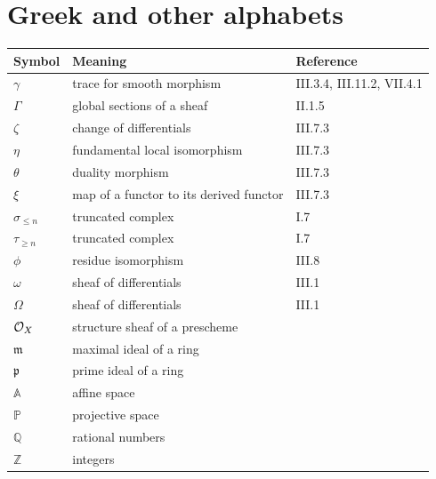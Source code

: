 \section*{Greek and other alphabets}
\begin{longtable}{@{}l p{8cm} l@{}}
	\toprule
	Symbol & Meaning & Reference \\
	\midrule
	$\gamma$ & trace for smooth morphism & III.3.4, III.11.2, VII.4.1 \\
	$\Gamma$ & global sections of a sheaf & II.1.5 \\
	$\zeta$ & change of differentials & III.7.3 \\
	$\eta$ & fundamental local isomorphism  & III.7.3 \\
	$\theta$ & duality morphism  & III.7.3 \\
	$\xi$ & map of a functor to its derived functor  & III.7.3 \\
	$\sigma_{\leq n}$ & truncated complex & I.7 \\
	$\tau_{\geq n}$ & truncated complex & I.7 \\
	$\phi$ & residue isomorphism & III.8 \\
	$\omega$ & sheaf of differentials & III.1 \\
	$\Omega$ & sheaf of differentials & III.1 \\
	$\mathcal{O}_X$ & structure sheaf of a prescheme & \\
	$\mathfrak{m}$ & maximal ideal of a ring & \\
	$\mathfrak{p}$ & prime ideal of a ring & \\
	$\mathbb{A}$ & affine space & \\
	$\mathbb{P}$ & projective space & \\
	$\mathbb{Q}$ & rational numbers & \\
	$\mathbb{Z}$ & integers & \\
\end{longtable}

